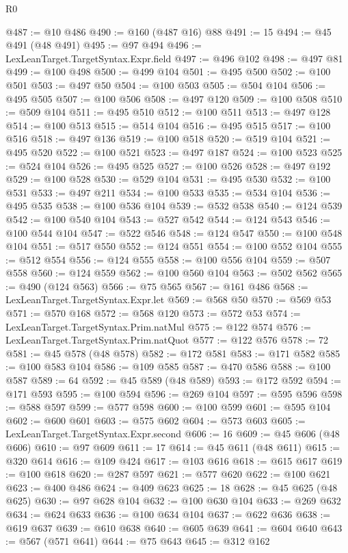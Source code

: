 \begin{lexlean}{R0}
\begin{coremodule}
@487 := @10 @486
@490 := @160 (@487 @16) @88
@491 := 15
@494 := @45 @491 (@48 @491)
@495 := @97 @494
@496 := LexLeanTarget.TargetSyntax.Expr.field
@497 := @496 @102
@498 := @497 @81
@499 := @100 @498
@500 := @499 @104
@501 := @495 @500
@502 := @100 @501
@503 := @497 @50
@504 := @100 @503
@505 := @504 @104
@506 := @495 @505
@507 := @100 @506
@508 := @497 @120
@509 := @100 @508
@510 := @509 @104
@511 := @495 @510
@512 := @100 @511
@513 := @497 @128
@514 := @100 @513
@515 := @514 @104
@516 := @495 @515
@517 := @100 @516
@518 := @497 @136
@519 := @100 @518
@520 := @519 @104
@521 := @495 @520
@522 := @100 @521
@523 := @497 @187
@524 := @100 @523
@525 := @524 @104
@526 := @495 @525
@527 := @100 @526
@528 := @497 @192
@529 := @100 @528
@530 := @529 @104
@531 := @495 @530
@532 := @100 @531
@533 := @497 @211
@534 := @100 @533
@535 := @534 @104
@536 := @495 @535
@538 := @100 @536 @104
@539 := @532 @538
@540 := @124 @539
@542 := @100 @540 @104
@543 := @527 @542
@544 := @124 @543
@546 := @100 @544 @104
@547 := @522 @546
@548 := @124 @547
@550 := @100 @548 @104
@551 := @517 @550
@552 := @124 @551
@554 := @100 @552 @104
@555 := @512 @554
@556 := @124 @555
@558 := @100 @556 @104
@559 := @507 @558
@560 := @124 @559
@562 := @100 @560 @104
@563 := @502 @562
@565 := @490 (@124 @563)
@566 := @75 @565
@567 := @161 @486
@568 := LexLeanTarget.TargetSyntax.Expr.let
@569 := @568 @50
@570 := @569 @53
@571 := @570 @168
@572 := @568 @120
@573 := @572 @53
@574 := LexLeanTarget.TargetSyntax.Prim.natMul
@575 := @122 @574
@576 := LexLeanTarget.TargetSyntax.Prim.natQuot
@577 := @122 @576
@578 := 72
@581 := @45 @578 (@48 @578)
@582 := @172 @581
@583 := @171 @582
@585 := @100 @583 @104
@586 := @109 @585
@587 := @470 @586
@588 := @100 @587
@589 := 64
@592 := @45 @589 (@48 @589)
@593 := @172 @592
@594 := @171 @593
@595 := @100 @594
@596 := @269 @104
@597 := @595 @596
@598 := @588 @597
@599 := @577 @598
@600 := @100 @599
@601 := @595 @104
@602 := @600 @601
@603 := @575 @602
@604 := @573 @603
@605 := LexLeanTarget.TargetSyntax.Expr.second
@606 := 16
@609 := @45 @606 (@48 @606)
@610 := @97 @609
@611 := 17
@614 := @45 @611 (@48 @611)
@615 := @320 @614
@616 := @109 @424
@617 := @103 @616
@618 := @615 @617
@619 := @100 @618
@620 := @287 @597
@621 := @577 @620
@622 := @100 @621
@623 := @400 @486
@624 := @409 @623
@625 := 18
@628 := @45 @625 (@48 @625)
@630 := @97 @628 @104
@632 := @100 @630 @104
@633 := @269 @632
@634 := @624 @633
@636 := @100 @634 @104
@637 := @622 @636
@638 := @619 @637
@639 := @610 @638
@640 := @605 @639
@641 := @604 @640
@643 := @567 (@571 @641)
@644 := @75 @643
@645 := @312 @162

\end{coremodule}
\end{lexlean}
